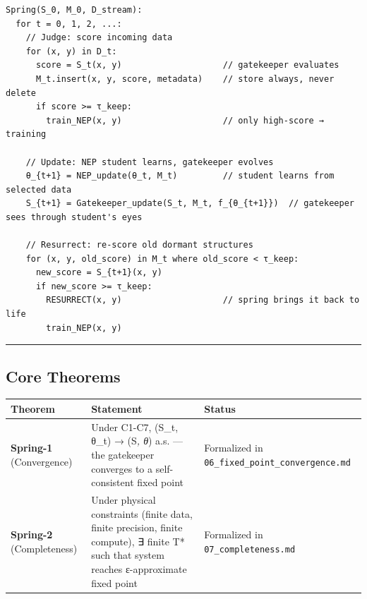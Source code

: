 \documentclass[
  12pt,
]{article}
\begin{document}
\begin{verbatim}
Spring(S_0, M_0, D_stream):
  for t = 0, 1, 2, ...:
    // Judge: score incoming data
    for (x, y) in D_t:
      score = S_t(x, y)                    // gatekeeper evaluates
      M_t.insert(x, y, score, metadata)    // store always, never delete
      if score >= τ_keep:
        train_NEP(x, y)                    // only high-score → training
    
    // Update: NEP student learns, gatekeeper evolves
    θ_{t+1} = NEP_update(θ_t, M_t)         // student learns from selected data
    S_{t+1} = Gatekeeper_update(S_t, M_t, f_{θ_{t+1}})  // gatekeeper sees through student's eyes
    
    // Resurrect: re-score old dormant structures
    for (x, y, old_score) in M_t where old_score < τ_keep:
      new_score = S_{t+1}(x, y)
      if new_score >= τ_keep:
        RESURRECT(x, y)                    // spring brings it back to life
        train_NEP(x, y)
\end{verbatim}

\begin{center}\rule{0.5\linewidth}{0.5pt}\end{center}

\subsection{Core Theorems}\label{core-theorems}

\begin{longtable}[]{@{}
  >{\raggedright\arraybackslash}p{}
  >{\raggedright\arraybackslash}p{}
  >{\raggedright\arraybackslash}p{}@{}}
\toprule\noalign{}
\begin{minipage}[b]{\linewidth}\raggedright
Theorem
\end{minipage} & \begin{minipage}[b]{\linewidth}\raggedright
Statement
\end{minipage} & \begin{minipage}[b]{\linewidth}\raggedright
Status
\end{minipage} \\
\midrule\noalign{}
\endhead
\bottomrule\noalign{}
\endlastfoot
\textbf{Spring-1} (Convergence) & Under C1-C7, (S\_t, θ\_t) → (S\emph{,
θ}) a.s. --- the gatekeeper converges to a self-consistent fixed point &
Formalized in \texttt{06\_fixed\_point\_convergence.md} \\
\textbf{Spring-2} (Completeness) & Under physical constraints (finite
data, finite precision, finite compute), ∃ finite T* such that system
reaches ε-approximate fixed point & Formalized in
\texttt{07\_completeness.md} \\
\end{longtable}
\end{document}
